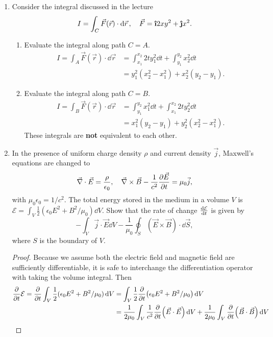 \documentclass[11pt]{article}
\newcommand{\ihat}{\boldsymbol{\hat{\textbf{\i}}}}
\newcommand{\jhat}{\boldsymbol{\hat{\textbf{\j}}}}
\begin{document}
\begin{enumerate}%
    \item Consider the integral discussed in the lecture \[I = \int_C \vec{F}(\vec{r})\cdot \dd{\vec{r}}, \quad \vec{F} = \ihat 2xy^2 + \jhat x^2.\]
    \begin{enumerate}[label=(\alph*)]
        \item Evaluate the integral along path $C=A$. \begin{align*}
            I = \int_A \vec{F}(\vec{r})\cdot \dd{\vec{r}} &= \int_{x_1}^{x_2} 2ty_1^2\dd{t} + \int_{y_1}^{y_2} x_2^2\dd{t}\\
            &= \boxed{y_1^2(x_2^2-x_1^2) + x_2^2(y_2-y_1)}.
        \end{align*}
        \item Evaluate the integral along path $C=B$. \begin{align*}
            I = \int_B \vec{F}(\vec{r})\cdot \dd{\vec{r}} &= \int_{y_1}^{y_2}x_1^2\dd{t} + \int_{x_1}^{x_2}2ty_2^2\dd{t}\\
            &= \boxed{x_1^2(y_2-y_1) + y_2^2(x_2^2-x_1^2)}.
        \end{align*}
        These integrals are \textbf{not} equivalent to each other.
    \end{enumerate}
    \item In the presence of uniform charge density $\rho$ and current density $\vec{j}$, Maxwell's equations are changed to \[\vec{\nabla}\cdot \vec{E} = \frac{\rho}{\epsilon_0}, \quad \vec{\nabla}\times \vec{B} - \frac{1}{c^2}\pdv{\vec{E}}{t} = \mu_0 \vec{j},\] with $\mu_0\epsilon_0 = 1/c^2$. The total energy stored in the medium in a volume $V$ is $\mathcal{E} = \int_V \frac{1}{2}(\epsilon_0E^2 + B^2/\mu_0)\dd{V}$. Show that the rate of change $\dv{\mathcal{E}}{t}$ is given by \[-\int_V \vec{j}\cdot \vec{E}\dd{V} - \frac{1}{\mu_0}\oint_S (\vec{E}\times \vec{B})\cdot \dd{\vec{S}},\] where $S$ is the boundary of $V$.
    \begin{proof}
        Because we assume both the electric field and magnetic field are sufficiently differentiable, it is safe to interchange the differentiation operator with taking the volume integral. Then \begin{align*}
            \pdv{t}\mathcal{E} = \pdv{t}\int_V \frac{1}{2}(\epsilon_0E^2 + B^2/\mu_0)\dd{V} &= \int_V \frac{1}{2}\pdv{t}(\epsilon_0E^2 + B^2/\mu_0)\dd{V}\\
            &= \frac{1}{2\mu_0}\int_V \frac{1}{c^2}\pdv{t}(\vec{E}\cdot\vec{E})\dd{V} + \frac{1}{2\mu_0}\int_V \pdv{t}(\vec{B}\cdot\vec{B})\dd{V} \\

\end{align*}
\end{proof}
\end{enumerate}
\end{document}
